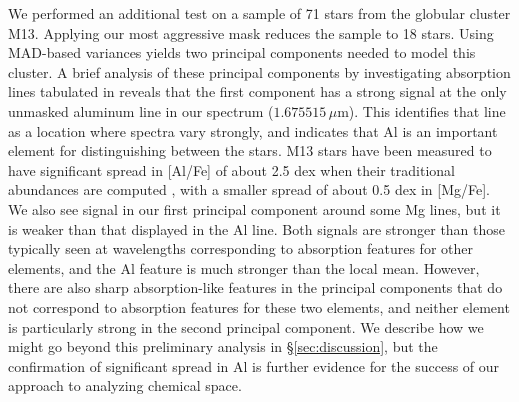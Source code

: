 \documentclass[a4paper,fleqn,usenatbib]{mnras}
\newcommand       \Rsq      {{R^2}}
\newcommand       \Rnoise   {{R^2_{\mathrm{noise}}}}
\begin{document}
We performed an additional test on a sample of 71 stars from the globular cluster M13. Applying our most aggressive mask reduces the sample to 18 stars. Using MAD-based variances yields two principal components needed to model this cluster. A brief analysis of these principal components by investigating absorption lines tabulated in \citet{Smith2013} reveals that the first component has a strong signal at the only unmasked aluminum line in our spectrum ($1.675515\,\mu\mathrm{m}$). This identifies that line as a location where spectra vary strongly, and indicates that Al is an important element for distinguishing between the stars. M13 stars have been measured to have significant spread in [Al/Fe] of about 2.5 dex when their traditional abundances are computed \citep{Meszaros2015}, with a smaller spread of about 0.5 dex in [Mg/Fe]. We also see signal in our first principal component around some Mg lines, but it is weaker than that displayed in the Al line. Both signals are stronger than those typically seen at wavelengths corresponding to absorption features for other elements, and the Al feature is much stronger than the local mean. However, there are also sharp absorption-like features in the principal components that do not correspond to absorption features for these two elements, and neither element is particularly strong in the second principal component. We describe how we might go beyond this preliminary analysis in \S\ref{sec:discussion}, but the confirmation of significant spread in Al is further evidence for the success of our approach to analyzing chemical space.


\end{document}
